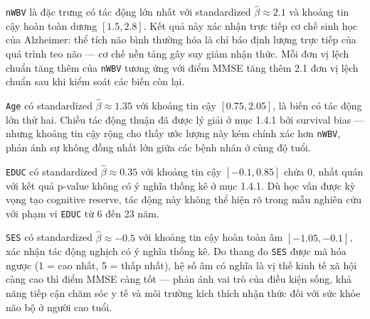 \texttt{nWBV} là đặc trưng có tác động lớn nhất với standardized $\hat{\beta} \approx 2.1$ và khoảng tin cậy hoàn toàn dương $[1.5, 2.8]$. Kết quả này xác nhận trực tiếp cơ chế sinh học của Alzheimer: thể tích não bình thường hóa là chỉ báo định lượng trực tiếp của quá trình teo não — cơ chế nền tảng gây suy giảm nhận thức. Mỗi đơn vị lệch chuẩn tăng thêm của \texttt{nWBV} tương ứng với điểm MMSE tăng thêm 2.1 đơn vị lệch chuẩn sau khi kiểm soát các biến còn lại.

\texttt{Age} có standardized $\hat{\beta} \approx 1.35$ với khoảng tin cậy $[0.75, 2.05]$, là biến có tác động lớn thứ hai. Chiều tác động thuận đã được lý giải ở mục 1.4.1 bởi survival bias — nhưng khoảng tin cậy rộng cho thấy ước lượng này kém chính xác hơn \texttt{nWBV}, phản ánh sự không đồng nhất lớn giữa các bệnh nhân ở cùng độ tuổi.

\texttt{EDUC} có standardized $\hat{\beta} \approx 0.35$ với khoảng tin cậy $[-0.1, 0.85]$ chứa 0, nhất quán với kết quả p-value không có ý nghĩa thống kê ở mục 1.4.1. Dù học vấn được kỳ vọng tạo cognitive reserve, tác động này không thể hiện rõ trong mẫu nghiên cứu với phạm vi \texttt{EDUC} từ 6 đến 23 năm.

\texttt{SES} có standardized $\hat{\beta} \approx -0.5$ với khoảng tin cậy hoàn toàn âm $[-1.05, -0.1]$, xác nhận tác động nghịch có ý nghĩa thống kê. Do thang đo \texttt{SES} được mã hóa ngược (1 = cao nhất, 5 = thấp nhất), hệ số âm có nghĩa là vị thế kinh tế xã hội càng cao thì điểm MMSE càng tốt — phản ánh vai trò của điều kiện sống, khả năng tiếp cận chăm sóc y tế và môi trường kích thích nhận thức đối với sức khỏe não bộ ở người cao tuổi.
